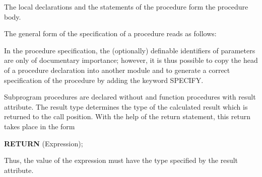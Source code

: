 The local declarations and the statements of the procedure form the
procedure body.














The general form of the specification of a procedure reads as follows:





In the procedure specification, the (optionally) definable identifiers of
parameters are only of documentary importance; however, it is thus
possible to copy the head of a procedure declaration into another module
and to generate a correct specification of the procedure by adding the
keyword SPECIFY.

Subprogram procedures are declared without and function procedures with
result attribute. The result type determines the type of the calculated
result which is returned to the call position. With the help of the
return statement, this return takes place in the form

{\bf RETURN} (Expression);

Thus, the value of the expression must have the type specified by the
result attribute.

